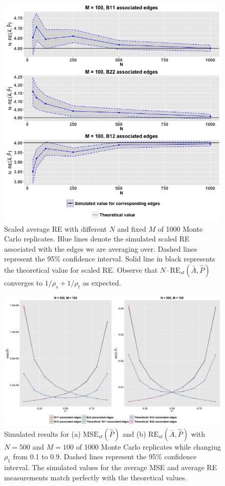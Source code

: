\documentclass[a4paper]{article}
\begin{document}
\begin{figure}[!htb]
	\centering
	\includegraphics[width=12cm]{RE.png}
	\caption{Scaled average RE with different $N$ and fixed $M$ of 1000 Monte Carlo replicates. Blue lines denote the simulated scaled RE associated with the edges we are averaging over. Dashed lines represent the 95\% confidence interval. Solid line in black represents the theoretical value for scaled RE. Observe that $N \cdot \mathrm{RE}_{st}(\bar{A}, \hat{P})$ converges to $1/\rho_s + 1/\rho_t$ as expected.}
	\label{fig:RE}
\end{figure}

\begin{figure}[!htb]
\centering
\includegraphics[width=16cm]{Rho.png}
\caption{Simulated results for (a) $\mathrm{MSE}_{st}(\hat{P})$ and (b) $\mathrm{RE}_{st}(\bar{A}, \hat{P})$ with $N = 500$ and $M = 100$ of 1000 Monte Carlo replicates while changing $\rho_1$ from 0.1 to 0.9. Dashed lines represent the 95\% confidence interval. The simulated values for the average MSE and average RE measurements match perfectly with the theoretical values.}
\label{fig:RErho}
\end{figure}
\end{document}

